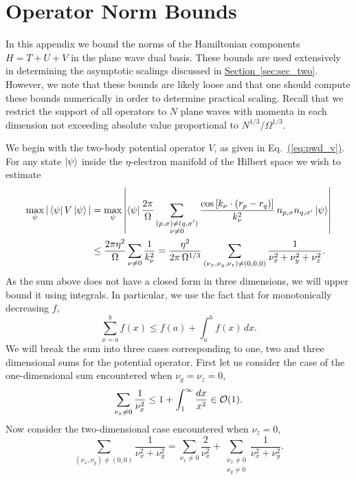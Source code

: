 \documentclass[superscriptaddress,aps,pra,nofootinbib,notitlepage,10pt,longbibliography]{revtex4-1}
\newcommand{\eq}[1]{Eq.~\hyperref[eq:#1]{(\ref*{eq:#1})}}
\renewcommand{\sec}[1]{\hyperref[sec:#1]{Section~\ref*{sec:#1}}}
\def\bra#1{\mathinner{\langle{#1}|}}
\def\ket#1{\mathinner{|{#1}\rangle}}
\begin{document}
\section{Operator Norm Bounds}
\label{app:operators}

In this appendix we bound the norms of the Hamiltonian components $H = T + U + V$ in the plane wave dual basis. These bounds are used extensively in determining the asymptotic scalings discussed in \sec{sec_two}. However, we note that these bounds are likely loose and that one should compute these bounds numerically in order to determine practical scaling. Recall that we restrict the support of all operators to $N$ plane waves with momenta in each dimension not exceeding absolute value proportional to $N^{1/3}/\Omega^{1/3}$.

We begin with  the two-body potential operator $V$, as given in \eq{pwd_v}. For any state $\ket{\psi}$ inside the $\eta$-electron manifold of the Hilbert space we wish to estimate
\begin{align}
\max_{\psi} | \bra{\psi} V\ket{\psi}| & =  \max_\psi \left | \bra{\psi} \frac{2\pi}{\Omega} \sum_{\substack{(p,\sigma) \ne (q,\sigma') \\ \nu \neq 0}} \frac{\cos\left[k_\nu\cdot \left(r_p-r_q\right)\right]}{k_\nu^2} \, n_{p,\sigma}n_{q,\sigma'} \ket{\psi} \right| \\
%
& \le \frac{2\pi \eta^2}{\Omega} \sum_{\nu \neq 0} \frac{1}{k_\nu^2} = \frac{\eta^2}{2 \pi \, \Omega^{1/3}} \sum_{(\nu_x, \nu_y, \nu_z) \neq (0,0,0)} \frac{1}{\nu_x^2 + \nu_y^2 + \nu_z^2}.\nonumber
\end{align}
As the sum above does not have a closed form in three dimensions, we will upper bound it using integrals. In particular, we use the fact that for monotonically decreasing $f$,
\begin{equation}
\sum_{x=a}^b f(x) \le f(a)+\int_{a}^b f(x) \, dx.
\end{equation}
We will break the sum into three cases corresponding to one, two and three dimensional sums for the potential operator. First let us consider the case of the one-dimensional sum encountered when $\nu_y = \nu_z = 0$,
\begin{equation}
\sum_{\nu_x\ne 0}\frac{1}{\nu_x^2} \le 1+\int_{1}^\infty \frac{dx}{x^2} \in {\cal O}(1).\label{eq:1Dsum}
\end{equation}
Now consider the two-dimensional case encountered when $\nu_z = 0$,
\begin{equation}
 \sum_{(\nu_x, \nu_y) \neq (0,0)} \frac{1}{\nu_x^2 + \nu_y^2} 
= \sum_{\nu_x \neq 0} \frac{2}{\nu_x^2} + \sum_{\substack{\nu_x \neq 0 \\ \nu_y \neq 0}} \frac{1}{\nu_x^2 + \nu_y^2}.
\end{equation}
\end{document}
